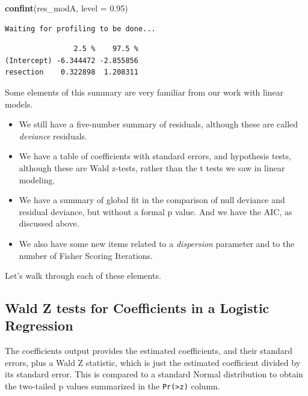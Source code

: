 \documentclass[]{book}
\newenvironment{Shaded}{\begin{snugshade}}{\end{snugshade}}
\newcommand{\KeywordTok}[1]{\textcolor[rgb]{0.13,0.29,0.53}{\textbf{#1}}}
\newcommand{\DataTypeTok}[1]{\textcolor[rgb]{0.13,0.29,0.53}{#1}}
\newcommand{\FloatTok}[1]{\textcolor[rgb]{0.00,0.00,0.81}{#1}}
\newcommand{\NormalTok}[1]{#1}
\providecommand{\tightlist}{%
  \setlength{\itemsep}{0pt}\setlength{\parskip}{0pt}}
\theoremstyle{definition}
\theoremstyle{definition}
\theoremstyle{definition}
\theoremstyle{remark}
\begin{document}
\begin{Shaded}
\begin{Highlighting}[]
\KeywordTok{confint}\NormalTok{(res_modA, }\DataTypeTok{level =} \FloatTok{0.95}\NormalTok{)}
\end{Highlighting}
\end{Shaded}

\begin{verbatim}
Waiting for profiling to be done...
\end{verbatim}

\begin{verbatim}
                2.5 %    97.5 %
(Intercept) -6.344472 -2.855856
resection    0.322898  1.208311
\end{verbatim}

Some elements of this summary are very familiar from our work with
linear models.

\begin{itemize}
\tightlist
\item
  We still have a five-number summary of residuals, although these are
  called \emph{deviance} residuals.
\item
  We have a table of coefficients with standard errors, and hypothesis
  tests, although these are Wald z-tests, rather than the t tests we saw
  in linear modeling.
\item
  We have a summary of global fit in the comparison of null deviance and
  residual deviance, but without a formal p value. And we have the AIC,
  as discussed above.
\item
  We also have some new items related to a \emph{dispersion} parameter
  and to the number of Fisher Scoring Iterations.
\end{itemize}

Let's walk through each of these elements.

\subsection{Wald Z tests for Coefficients in a Logistic
Regression}\label{wald-z-tests-for-coefficients-in-a-logistic-regression}

The coefficients output provides the estimated coefficients, and their
standard errors, plus a Wald Z statistic, which is just the estimated
coefficient divided by its standard error. This is compared to a
standard Normal distribution to obtain the two-tailed p values
summarized in the \texttt{Pr(\textgreater{}\textbar{}z\textbar{})}
column.
\end{document}
